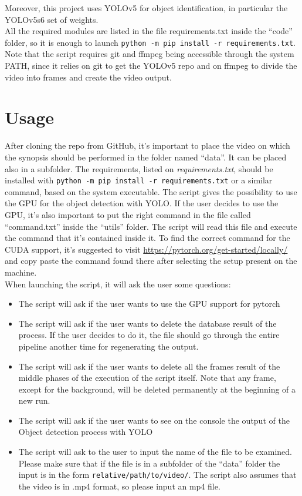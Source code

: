 \documentclass[conference]{IEEEtran}
\begin{document}
		Moreover, this project uses YOLOv5 for object identification, in particular the YOLOv5s6 set of weights.\\
		All the required modules are listed in the file requirements.txt inside the ``code'' folder, so it is enough to launch
		\texttt{python -m pip install -r requirements.txt}.\\
		Note that the script requires git and ffmpeg being accessible through the system PATH, since it relies on git to 
		get the YOLOv5 repo and on ffmpeg to divide the video into frames and create the video output.
		
	\section{Usage}
	
		After cloning the repo from GitHub, it's important to place the video on which the synopsis should be performed 
		in the folder named ``data''. It can be placed also in a subfolder. The requirements, listed on \textit{requirements.txt}, 
		should be installed with \texttt{python -m pip install -r requirements.txt} or a similar command, based on the system 
		executable. The script gives the possibility to use the GPU for the object detection with YOLO. If the user decides to 
		use the GPU, it's also important to put the right command in the file called ``command.txt'' inside the ``utils'' folder. 
		The script will read this file and execute the command that it's contained inside it. To find the correct command for the 
		CUDA support, it's suggested to visit \url{https://pytorch.org/get-started/locally/} and copy paste the command found there 
		after selecting the setup present on the machine.\\
		When launching the script, it will ask the user some questions: 
		\begin{itemize}
		
			\item The script will ask if the user wants to use the GPU support for pytorch
			\item The script will ask if the user wants to delete the database result of the process. If the user decides to do it, the 
				file should go through the entire pipeline another time for regenerating the output.
			\item The script will ask if the user wants to delete all the frames result of the middle phases of the execution of the script 
				itself. Note that any frame, except for the background, will be deleted permanently at the beginning of a new run.
			\item The script will ask if the user wants to see on the console the output of the Object detection process with YOLO
			\item The script will ask to the user to input the name of the file to be examined. Please make sure that if the file is in a 
			subfolder of the ``data'' folder the input is in the form \texttt{relative/path/to/video/}. The script also assumes that 
			the video is in .mp4 format, so please input an mp4 file.
		
		\end{itemize}
		
\end{document}
